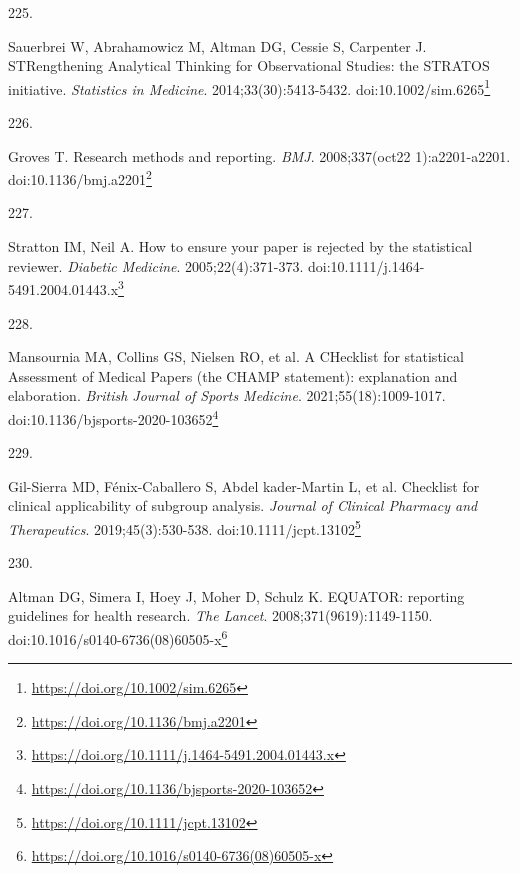 \documentclass[
  a4paper,
]{book}
\newlength{\cslhangindent}
\newlength{\csllabelwidth}
\newlength{\cslentryspacingunit} %
\newenvironment{CSLReferences}[2] %
 {%
  \setlength{\parindent}{0pt}
  \ifodd #1
  \let\oldpar\par
  \def\par{\hangindent=\cslhangindent\oldpar}
  \fi
  \setlength{\parskip}{#2\cslentryspacingunit}
 }%
 {}
\newcommand{\CSLLeftMargin}[1]{\parbox[t]{\csllabelwidth}{#1}}
\newcommand{\CSLRightInline}[1]{\parbox[t]{\linewidth - \csllabelwidth}{#1}\break}
\renewcommand{\href}[2]{#2\footnote{\url{#1}}}
\begin{document}
\begin{CSLReferences}{0}{0}
\leavevmode{}%
\CSLLeftMargin{225. }%
\CSLRightInline{Sauerbrei W, Abrahamowicz M, Altman DG, Cessie S, Carpenter J. STRengthening Analytical Thinking for Observational Studies: the STRATOS initiative. \emph{Statistics in Medicine}. 2014;33(30):5413-5432. doi:\href{https://doi.org/10.1002/sim.6265}{10.1002/sim.6265}}

\leavevmode{}%
\CSLLeftMargin{226. }%
\CSLRightInline{Groves T. Research methods and reporting. \emph{BMJ}. 2008;337(oct22 1):a2201-a2201. doi:\href{https://doi.org/10.1136/bmj.a2201}{10.1136/bmj.a2201}}

\leavevmode{}%
\CSLLeftMargin{227. }%
\CSLRightInline{Stratton IM, Neil A. How to ensure your paper is rejected by the statistical reviewer. \emph{Diabetic Medicine}. 2005;22(4):371-373. doi:\href{https://doi.org/10.1111/j.1464-5491.2004.01443.x}{10.1111/j.1464-5491.2004.01443.x}}

\leavevmode{}%
\CSLLeftMargin{228. }%
\CSLRightInline{Mansournia MA, Collins GS, Nielsen RO, et al. A CHecklist for statistical Assessment of Medical Papers (the CHAMP statement): explanation and elaboration. \emph{British Journal of Sports Medicine}. 2021;55(18):1009-1017. doi:\href{https://doi.org/10.1136/bjsports-2020-103652}{10.1136/bjsports-2020-103652}}

\leavevmode{}%
\CSLLeftMargin{229. }%
\CSLRightInline{Gil-Sierra MD, Fénix-Caballero S, Abdel kader-Martin L, et al. Checklist for clinical applicability of subgroup analysis. \emph{Journal of Clinical Pharmacy and Therapeutics}. 2019;45(3):530-538. doi:\href{https://doi.org/10.1111/jcpt.13102}{10.1111/jcpt.13102}}

\leavevmode{}%
\CSLLeftMargin{230. }%
\CSLRightInline{Altman DG, Simera I, Hoey J, Moher D, Schulz K. EQUATOR: reporting guidelines for health research. \emph{The Lancet}. 2008;371(9619):1149-1150. doi:\href{https://doi.org/10.1016/s0140-6736(08)60505-x}{10.1016/s0140-6736(08)60505-x}}

\end{CSLReferences}


\end{document}
